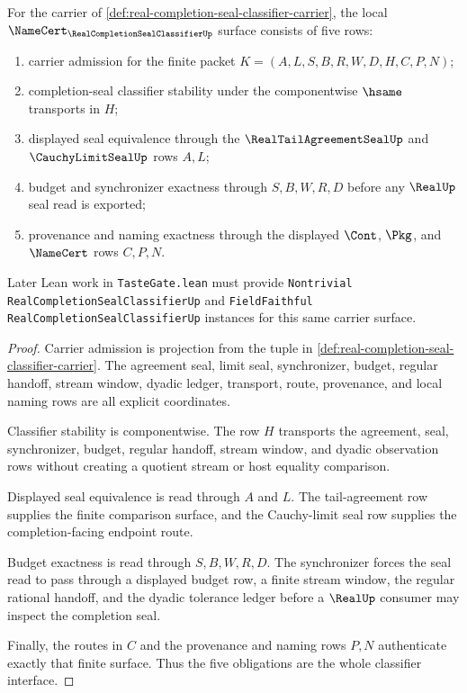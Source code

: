 \begin{theorem}
\label{thm:real-completion-seal-classifier-obligations}
For the carrier of \autoref{def:real-completion-seal-classifier-carrier}, the local $\NameCert_{\RealCompletionSealClassifierUp}$ surface consists of five rows:
\begin{enumerate}
\item carrier admission for the finite packet $K=(A,L,S,B,R,W,D,H,C,P,N)$;
\item completion-seal classifier stability under the componentwise $\hsame$ transports in $H$;
\item displayed seal equivalence through the $\RealTailAgreementSealUp$ and $\CauchyLimitSealUp$ rows $A,L$;
\item budget and synchronizer exactness through $S,B,W,R,D$ before any $\RealUp$ seal read is exported;
\item provenance and naming exactness through the displayed $\Cont$, $\Pkg$, and $\NameCert$ rows $C,P,N$.
\end{enumerate}
Later Lean work in \texttt{TasteGate.lean} must provide \texttt{Nontrivial RealCompletionSealClassifierUp} and \texttt{FieldFaithful RealCompletionSealClassifierUp} instances for this same carrier surface.
\end{theorem}
\begin{proof}
Carrier admission is projection from the tuple in \autoref{def:real-completion-seal-classifier-carrier}. The agreement seal, limit seal, synchronizer, budget, regular handoff, stream window, dyadic ledger, transport, route, provenance, and local naming rows are all explicit coordinates.

Classifier stability is componentwise. The row $H$ transports the agreement, seal, synchronizer, budget, regular handoff, stream window, and dyadic observation rows without creating a quotient stream or host equality comparison.

Displayed seal equivalence is read through $A$ and $L$. The tail-agreement row supplies the finite comparison surface, and the Cauchy-limit seal row supplies the completion-facing endpoint route.

Budget exactness is read through $S,B,W,R,D$. The synchronizer forces the seal read to pass through a displayed budget row, a finite stream window, the regular rational handoff, and the dyadic tolerance ledger before a $\RealUp$ consumer may inspect the completion seal.

Finally, the routes in $C$ and the provenance and naming rows $P,N$ authenticate exactly that finite surface. Thus the five obligations are the whole classifier interface.
\end{proof}

